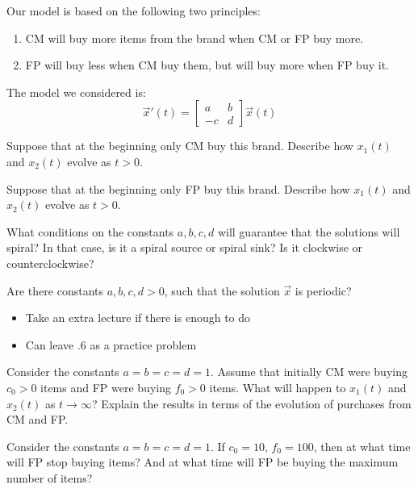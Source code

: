 	Our model is based on the following two principles:
	\begin{enumerate}[label={($P_{\arabic*}$)}]
		\item CM will buy more items from the brand when CM or FP buy more.
		\item FP will buy less when CM buy them, but will buy more when FP buy it.
	\end{enumerate}

	The model we considered is:
	$$
	\vec{x}'(t) = 
	\begin{bmatrix}
 		a & b \\
 		-c & d
	\end{bmatrix}
	\vec{x}(t)
	$$
	
	\begin{parts}
		\item Suppose that at the beginning only CM buy this brand. Describe how $x_1(t)$ and $x_2(t)$ evolve as $t>0$.


		\item Suppose that at the beginning only FP buy this brand. Describe how $x_1(t)$ and $x_2(t)$ evolve as $t>0$.


		\item What conditions on the constants $a,b,c,d$ will guarantee that the solutions will spiral? In that case, is it a spiral source or spiral sink? Is it clockwise or counterclockwise?
		\item Are there constants $a,b,c,d>0$, such that the solution $\vec{x}$ is periodic?
\begin{annotation}
	\begin{goals}
		\begin{itemize}
			\item Take an extra lecture if there is enough to do
			\item Can leave .6 as a practice problem
		\end{itemize}
	\end{goals}
\end{annotation}
		\item Consider the constants $a=b=c=d=1$. Assume that initially CM were buying $c_0>0$ items and FP were buying $f_0>0$ items.
			What will happen to $x_1(t)$ and $x_2(t)$ as $t \to \infty$? Explain the results in terms of the evolution of purchases from CM and FP.
		\item Consider the constants $a=b=c=d=1$.  If $c_0=10$, $f_0=100$, then at what time will FP stop buying items? And at what time will FP be buying the maximum number of items?
	
	\end{parts}




\bookonlynewpage


\hfill

\bookonlynewpage
\standardonlynewpage
